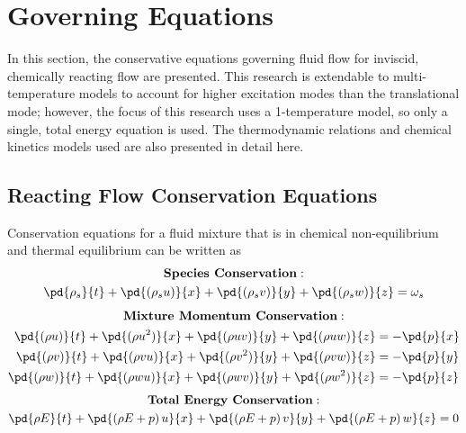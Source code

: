 \chapter{Governing Equations}
\label{chapter-two}

In this section, the conservative equations governing fluid flow for inviscid,
chemically reacting flow are presented.  This research is extendable to
multi-temperature models to account for higher excitation modes than the
translational mode; however, the focus of this research uses a 1-temperature
model, so only a single, total energy equation is used.  The thermodynamic
relations and chemical kinetics models used are also presented in detail here.

\section{Reacting Flow Conservation Equations}

Conservation equations for a fluid mixture that is in chemical non-equilibrium
and thermal equilibrium can be written as
\begin{equation}
  \begin{gathered}
    \text{\bf{Species Conservation}}: \\
     \pd{\rho_s}{t} + 
     \pd{\left(\rho_s u \right)}{x} + 
     \pd{\left(\rho_s v \right)}{y} + 
     \pd{\left(\rho_s w \right)}{z} =
     \omega_s
  \end{gathered}
  \label{species-cons}
\end{equation}
\begin{equation}
  \begin{gathered}
    \text{\bf{Mixture Momentum Conservation}}: \\
    \begin{aligned}
    \pd{(\rho u)}{t} + \pd{(\rho u^2)}{x} + \pd{(\rho u v)}{y} + \pd{(\rho u w)}{z} &= -\pd{p}{x}\\
    \pd{(\rho v)}{t} + \pd{(\rho v u)}{x} + \pd{(\rho v^2)}{y} + \pd{(\rho v w)}{z} &= -\pd{p}{y}\\
    \pd{(\rho w)}{t} + \pd{(\rho w u)}{x} + \pd{(\rho w v)}{y} + \pd{(\rho w^2)}{z} &= -\pd{p}{z}
    \end{aligned}
  \end{gathered}
  \label{mix-mom-cons}
\end{equation}
\begin{equation}
  \begin{gathered}
    \text{\bf{Total Energy Conservation}}: \\
     \pd{\rho E}{t} 
    + \pd{\left( \rho E + p \right) u}{x} 
    + \pd{\left( \rho E + p \right) v}{y}
    + \pd{\left( \rho E + p \right) w}{z} = 0
  \end{gathered}
  \label{tot-energy-cons}
\end{equation}

